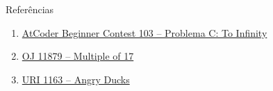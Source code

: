 \begin{frame}[fragile]{Referências}

    \begin{enumerate}
        \item \href{https://atcoder.jp/contests/abc106/tasks/abc106_c}{AtCoder Beginner Contest 103 -- Problema C: To Infinity}

        \item \href{https://onlinejudge.org/index.php?option=com_onlinejudge&Itemid=8&category=24&page=show_problem&problem=3001}{OJ 11879 -- Multiple of 17}

        \item \href{https://www.urionlinejudge.com.br/judge/pt/problems/view/1163}{URI 1163 -- Angry Ducks}
    \end{enumerate}

\end{frame}
